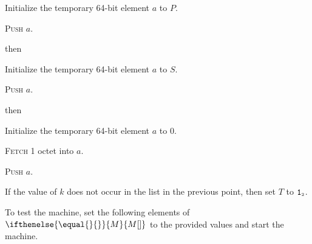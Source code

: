\documentclass[a4paper,12pt]{article}
\newcommand{\num}[1]{\texttt{#1}}
\newcommand{\hex}[1]{\num{#1}_{\textup{\tiny 16}}}
\newcommand{\bin}[1]{\num{#1}_{\textup{\tiny 2}}}
\newcommand{\MEM}[1]{\ifthenelse{\equal{#1}{}}{M}{M[#1]}}
\newcommand{\PC}{P}
\newcommand{\SP}{S}
\newcommand{\TERM}{T}
\newcommand{\T}{\bin{1}}
\newcommand{\proc}[1]{\textsc{#1}}
\newcommand{\op}[1]{$#1$}
\newcommand{\GETSP}     [1]{\op{\hex{06}}}
\newcommand{\PUSHB}     [1]{\op{\hex{08}}}
\begin{document}
\begin{stepnumbers}
\begin{description}
    \begin{stepnumbers}
    \item Initialize the temporary 64-bit element $a$ to $\PC$.
    \item \proc{Push} $a$.
    \end{stepnumbers}
  \item[\GETSP{}] then
    \begin{stepnumbers}
    \item Initialize the temporary 64-bit element $a$ to $\SP$.
    \item \proc{Push} $a$.
    \end{stepnumbers}
  \item[\PUSHB{}] then
    \begin{stepnumbers}
    \item Initialize the temporary 64-bit element $a$ to 0.
    \item \proc{Fetch} 1 octet into $a$.
    \item \proc{Push} $a$.
    \end{stepnumbers}
  \end{description}
\item If the value of $k$ does not occur in the list in the previous point, then set $\TERM$ to $\T$.
\end{stepnumbers}
To test the machine, set the following elements of $\MEM{}$ to the provided values and start the machine.
\end{document}
